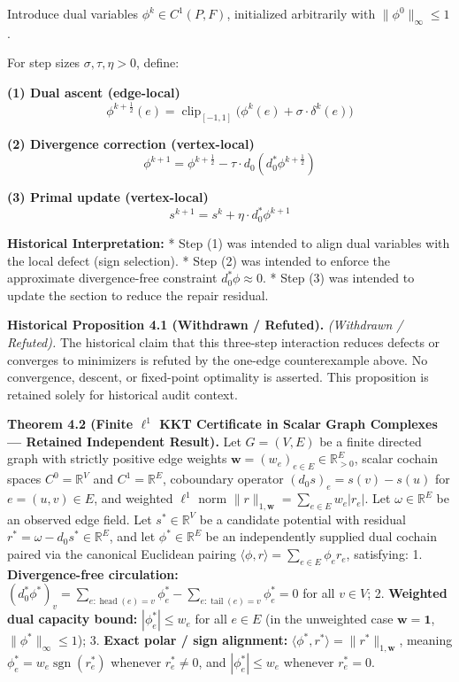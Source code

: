 \documentclass[
]{article}
\begin{document}
Introduce dual variables \(\phi^k \in C^1(P, F)\), initialized arbitrarily with \(\|\phi^0\|_\infty \le 1\).

For step sizes \(\sigma, \tau, \eta > 0\), define:

\textbf{(1) Dual ascent (edge-local)}
\[ \phi^{k+\frac{1}{2}}(e) = \operatorname{clip}_{[-1,1]} \Big( \phi^k(e) + \sigma \cdot \delta^k(e) \Big) \]

\textbf{(2) Divergence correction (vertex-local)}
\[ \phi^{k+1} = \phi^{k+\frac{1}{2}} - \tau \cdot d_0 (d_0^* \phi^{k+\frac{1}{2}}) \]

\textbf{(3) Primal update (vertex-local)}
\[ s^{k+1} = s^k + \eta \cdot d_0^* \phi^{k+1} \]

\textbf{Historical Interpretation:}
* Step (1) was intended to align dual variables with the local defect (sign selection).
* Step (2) was intended to enforce the approximate divergence-free constraint \(d_0^* \phi \approx 0\).
* Step (3) was intended to update the section to reduce the repair residual.

\textbf{Historical Proposition 4.1 (Withdrawn / Refuted).}
\emph{(Withdrawn / Refuted).} The historical claim that this three-step interaction reduces defects or converges to minimizers is refuted by the one-edge counterexample above. No convergence, descent, or fixed-point optimality is asserted. This proposition is retained solely for historical audit context.

\textbf{Theorem 4.2 (Finite \(\ell^1\) KKT Certificate in Scalar Graph Complexes --- Retained Independent Result).} Let \(G = (V, E)\) be a finite directed graph with strictly positive edge weights \(\mathbf{w} = (w_e)_{e \in E} \in \mathbb{R}_{>0}^E\), scalar cochain spaces \(C^0 = \mathbb{R}^V\) and \(C^1 = \mathbb{R}^E\), coboundary operator \((d_0 s)_e = s(v) - s(u)\) for \(e = (u,v) \in E\), and weighted \(\ell^1\) norm \(\|r\|_{1,\mathbf{w}} = \sum_{e \in E} w_e |r_e|\). Let \(\omega \in \mathbb{R}^E\) be an observed edge field. Let \(s^* \in \mathbb{R}^V\) be a candidate potential with residual \(r^* = \omega - d_0 s^* \in \mathbb{R}^E\), and let \(\phi^* \in \mathbb{R}^E\) be an independently supplied dual cochain paired via the canonical Euclidean pairing \(\langle \phi, r \rangle = \sum_{e \in E} \phi_e r_e\), satisfying:
1. \textbf{Divergence-free circulation:} \((d_0^* \phi^*)_v = \sum_{e: \operatorname{head}(e)=v} \phi_e^* - \sum_{e: \operatorname{tail}(e)=v} \phi_e^* = 0\) for all \(v \in V\);
2. \textbf{Weighted dual capacity bound:} \(|\phi_e^*| \le w_e\) for all \(e \in E\) (in the unweighted case \(\mathbf{w}=\mathbf{1}\), \(\|\phi^*\|_\infty \le 1\));
3. \textbf{Exact polar / sign alignment:} \(\langle \phi^*, r^* \rangle = \|r^*\|_{1,\mathbf{w}}\), meaning \(\phi_e^* = w_e \operatorname{sgn}(r_e^*)\) whenever \(r_e^* \ne 0\), and \(|\phi_e^*| \le w_e\) whenever \(r_e^* = 0\).
\end{document}
